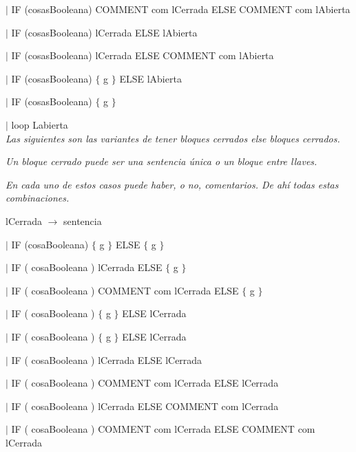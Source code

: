 \hspace{15mm}$|$ IF (cosasBooleana) COMMENT com lCerrada ELSE COMMENT com lAbierta 

\hspace{15mm}$|$ IF (cosasBooleana) lCerrada ELSE lAbierta

\hspace{15mm}$|$ IF (cosasBooleana) lCerrada ELSE COMMENT com lAbierta 

\hspace{15mm}$|$ IF (cosasBooleana) $\{$ g $\}$ ELSE lAbierta

\hspace{15mm}$|$ IF (cosasBooleana) $\{$ g $\}$ 

\hspace{15mm}$|$ loop Labierta \\

\textit{Las siguientes son las variantes de tener bloques cerrados else bloques cerrados.}

\textit{Un bloque cerrado puede ser una sentencia única o un bloque entre llaves.}

\textit{En cada uno de estos casos puede haber, o no, comentarios. De ahí todas estas combinaciones.} 


lCerrada $\rightarrow$ sentencia

\hspace{15mm}$|$ IF (cosaBooleana) $\{$ g $\}$ ELSE $\{$ g $\}$

\hspace{15mm}$|$ IF ( cosaBooleana ) lCerrada ELSE $\{$ g $\}$ 

\hspace{15mm}$|$ IF ( cosaBooleana ) COMMENT com lCerrada ELSE $\{$ g $\}$ 

\hspace{15mm}$|$ IF ( cosaBooleana ) $\{$ g $\}$ ELSE lCerrada 

\hspace{15mm}$|$ IF ( cosaBooleana ) $\{$ g $\}$ ELSE lCerrada 

\hspace{15mm}$|$ IF ( cosaBooleana ) lCerrada ELSE lCerrada 

\hspace{15mm}$|$ IF ( cosaBooleana ) COMMENT com lCerrada ELSE lCerrada 

\hspace{15mm}$|$ IF ( cosaBooleana ) lCerrada ELSE  COMMENT com lCerrada 

\hspace{15mm}$|$ IF ( cosaBooleana ) COMMENT com lCerrada ELSE  COMMENT com lCerrada

